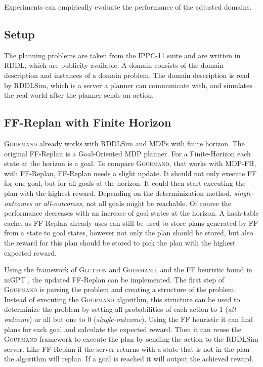 \documentclass[runningheads,a4paper]{llncs}
\begin{document}
Experiments can empirically evaluate the performance of the adjusted domains.

\subsection{Setup}

The planning problems are taken from the IPPC-11 suite and are written in RDDL,
which are publicity available. A domain consists of the domain description and
instances of a domain problem. The domain description is read by RDDLSim, which
is a server a planner can communicate with, and simulates the real world after
the planner sends an action.

\subsection{FF-Replan with Finite Horizon}

\textsc{Gourmand} already works with RDDLSim and MDPs with finite horizon. The original
FF-Replan is a Goal-Oriented MDP planner. For a Finite-Horizon each state at
the horizon is a goal. To compare \textsc{Gourmand}, that works with MDP-FH, with
FF-Replan, FF-Replan needs a slight update. It should not only execute FF for
one goal, but for all goals at the horizon. It could then start executing the
plan with the highest reward. Depending on the determinization method,
\emph{single-outcomes} or \emph{all-outcomes}, not all goals might be
reachable. Of course the performance decreases with an increase of goal states
at the horizon. A hash-table cache, as FF-Replan already uses can still be used
to store plans generated by FF from a state to goal states, however not only
the plan should be stored, but also the reward for this plan should be stored
to pick the plan with the highest expected reward.

Using the framework of \textsc{Glutton} and \textsc{Gourmand}, and the FF heuristic found in mGPT
\cite{bonet2011mgpt}, the updated FF-Replan can be implemented. The first step
of \textsc{Gourmand} is parsing the problem and creating a structure of the problem.
Instead of executing the \textsc{Gourmand} algorithm, this structure can be used to
determinize the problem by setting all probabilities of each action to 1
(\emph{all-outcome}) or all but one to 0 (\emph{single-outcome}). Using the
FF heuristic it can find plans for each goal and calculate the expected reward.
Then it can reuse the \textsc{Gourmand} framework to execute the plan by sending the
action to the RDDLSim server. Like FF-Replan if the server returns with a state
that is not in the plan the algorithm will replan. If a goal is reached it will
output the achieved reward.
\end{document}
